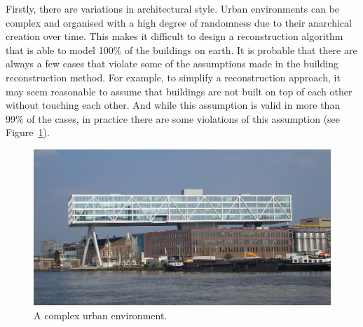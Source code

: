 Firstly, there are variations in architectural style. Urban environments can be complex and organised with a high degree of randomness due to their anarchical creation over time. This makes it difficult to design a reconstruction algorithm that is able to model 100\% of the buildings on earth. It is probable that there are always a few cases that violate some of the assumptions made in the building reconstruction method. For example, to simplify a reconstruction approach, it may seem reasonable to assume that buildings are not built on top of each other without touching each other. And while this assumption is valid in more than 99\% of the cases, in practice there are some violations of this assumption (see Figure~\ref{fig:debrug}).
\begin{figure}
	\centering
	\includegraphics[width=\linewidth]{figs/de_brug.jpg}
	\caption{A complex urban environment.}%
	\label{fig:debrug}
\end{figure}
	
